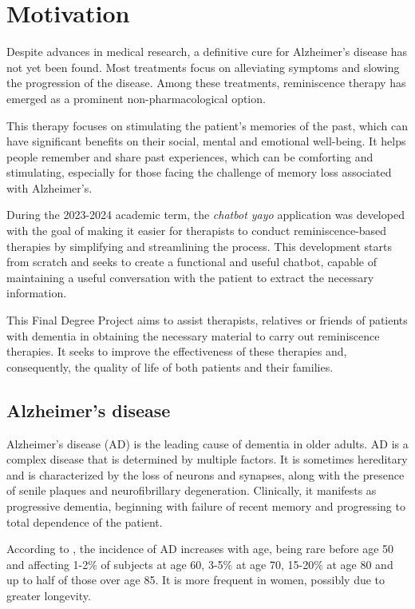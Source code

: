 \section{Motivation}
Despite advances in medical research, a definitive cure for Alzheimer's disease has not yet been found. Most treatments focus on alleviating symptoms and slowing the progression of the disease. Among these treatments, reminiscence therapy has emerged as a prominent non-pharmacological option.

This therapy focuses on stimulating the patient's memories of the past, which can have significant benefits on their social, mental and emotional well-being. It helps people remember and share past experiences, which can be comforting and stimulating, especially for those facing the challenge of memory loss associated with Alzheimer's.

During the 2023-2024 academic term, the \textit{chatbot yayo} application was developed with the goal of making it easier for therapists to conduct reminiscence-based therapies by simplifying and streamlining the process. This development starts from scratch and seeks to create a functional and useful chatbot, capable of maintaining a useful conversation with the patient to extract the necessary information.

This Final Degree Project aims to assist therapists, relatives or friends of patients with dementia in obtaining the necessary material to carry out reminiscence therapies. It seeks to improve the effectiveness of these therapies and, consequently, the quality of life of both patients and their families. 

\subsection{Alzheimer's disease}

Alzheimer's disease (AD) is the leading cause of dementia in older adults. AD is a complex disease that is determined by multiple factors. It is sometimes hereditary and is characterized by the loss of neurons and synapses, along with the presence of senile plaques and neurofibrillary degeneration. Clinically, it manifests as progressive dementia, beginning with failure of recent memory and progressing to total dependence of the patient.

According to \cite{Donoso2003}, the incidence of AD increases with age, being rare before age 50 and affecting 1-2$\%$ of subjects at age 60, 3-5$\%$ at age 70, 15-20$\%$ at age 80 and up to half of those over age 85. It is more frequent in women, possibly due to greater longevity.

